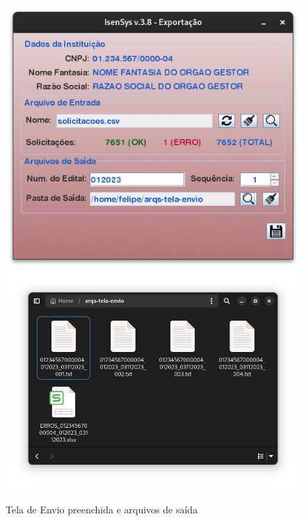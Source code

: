 \documentclass[
	12pt,			%
	openright,		%
	oneside,	
	a4paper,		%
	english,		%
	brazil			%
]{abntex2/abntex2}  %
\begin{document}
	\begin{figure}[H]
		\begin{center}
			
			\caption{Tela de Envio preenchida e arquivos de saída}
			\label{envio-ui-processed}
			
			\includegraphics[scale=0.4]{img/envio-ui-processed}
			\includegraphics[scale=0.3]{img/envio-files}
			
			
		\end{center}
	\end{figure}
\end{document}
